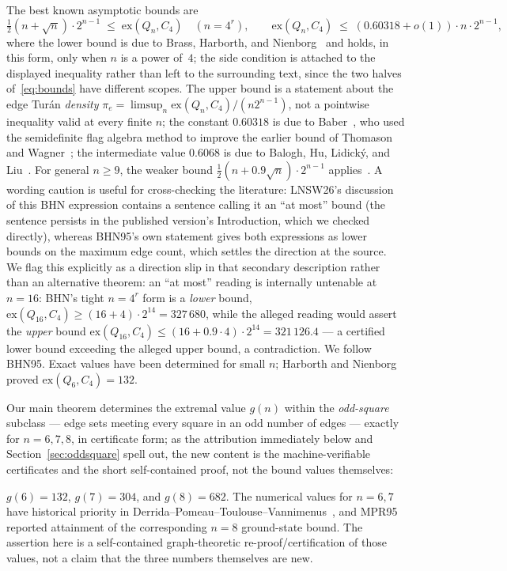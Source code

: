 \documentclass[12pt]{article}
\newcommand{\ex}{\mathrm{ex}}
\begin{document}
The best known asymptotic bounds are
\begin{equation}\label{eq:bounds}
\tfrac{1}{2}(n+\sqrt{n})\cdot2^{n-1}\;\le\;\ex(Q_n,C_4)
\quad (n=4^r),
\qquad
\ex(Q_n,C_4)\;\le\;(0.60318+o(1))\cdot n\cdot2^{n-1},
\end{equation}
where the lower bound is due to Brass, Harborth, and
Nienborg~\cite{BHN95} and holds, in this form, only when $n$ is a power
of~$4$; the side condition is attached to the displayed inequality rather
than left to the surrounding text, since the two halves of~\eqref{eq:bounds}
have different scopes. The upper bound is a statement about the edge
Tur\'an \emph{density} $\pi_e=\limsup_n\ex(Q_n,C_4)/(n2^{n-1})$, not a
pointwise inequality valid at every finite $n$; the constant $0.60318$
is due to Baber~\cite{Bab12}, who used the semidefinite flag algebra
method to improve the earlier bound of Thomason and Wagner~\cite{TW09};
the intermediate value $0.6068$ is due to Balogh, Hu, Lidick\'y, and
Liu~\cite{BHLL12}.
For general $n\ge9$, the weaker bound
$\tfrac{1}{2}(n+0.9\sqrt{n})\cdot2^{n-1}$ applies~\cite{BHN95}.
A wording caution is useful for cross-checking the literature: LNSW26's
discussion of this BHN expression contains a sentence calling it an ``at
most'' bound (the sentence persists in the published version's
Introduction, which we checked directly), whereas BHN95's own statement
gives both expressions as lower bounds on the maximum edge count, which
settles the direction at the source. We flag this explicitly as a
direction slip in that secondary description rather than an alternative
theorem: an ``at most'' reading is internally untenable at $n=16$: BHN's tight
$n=4^r$ form is a \emph{lower} bound,
$\ex(Q_{16},C_4)\ge(16+4)\cdot2^{14}=327\,680$, while the alleged
reading would assert the \emph{upper} bound
$\ex(Q_{16},C_4)\le(16+0.9\cdot4)\cdot2^{14}=321\,126.4$ --- a
certified lower bound exceeding the alleged upper bound, a
contradiction. We follow BHN95.
Exact values have been determined for small $n$; Harborth and Nienborg~\cite{HN94}
proved $\ex(Q_6,C_4)=132$.

Our main theorem determines the extremal value $g(n)$ within the
\emph{odd-square} subclass --- edge sets meeting every square in an odd
number of edges --- exactly for $n=6,7,8$, in certificate form; as the
attribution immediately below and Section~\ref{sec:oddsquare} spell out,
the new content is the machine-verifiable certificates and the short
self-contained proof, not the bound values themselves:

\begin{theorem}\label{thm:oddsquare}
$g(6)=132$, $g(7)=304$, and $g(8)=682$. The numerical values for $n=6,7$
have historical priority in Derrida--Pomeau--Toulouse--Vannimenus~\cite{DPTV79},
and MPR95~\cite{MPR95} reported attainment of the corresponding $n=8$
ground-state bound. The assertion here is a self-contained graph-theoretic
re-proof/certification of those values, not a claim that the three numbers
themselves are new.
\end{theorem}
\end{document}
